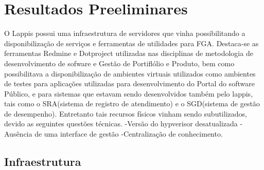 \chapter{Resultados Preeliminares}
O Lappis possui uma infraestrutura de servidores que vinha possibilitando a disponibilização de serviços e ferramentas de utilidades para FGA. Destaca-se as ferramentas Redmine e Dotproject utilizadas nas disciplinas de metodologia de desenvolvimento de sofware e Gestão de Portiflólio e Produto, bem como possibilitava a disponibilização de ambientes virtuais utilizados como ambientes de testes para aplicações utilizadas para desenvolvimento do Portal do software Público, e para sistemas que estavam sendo desenvolvidos também pelo  lappis, tais como o SRA(sistema de registro de atendimento) e o SGD(sistema de gestão de desempenho). Entretanto tais recursos físicos vinham sendo subutilizados, devido as seguintes questões técnicas.
      -Versão do hypverisor desatualizada
      -Ausência de uma interface de gestão
      -Centralização de conhecimento.
      
\section{Infraestrutura}

